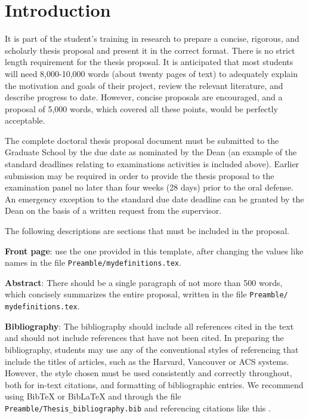 \chapter{Introduction} \label{ch-1}

It is part of the student's training in research to prepare a concise, rigorous, and scholarly thesis proposal and present it in the correct format. There is no strict length requirement for the thesis proposal. It is anticipated that most students will need 8,000-10,000 words (about twenty pages of text) to adequately explain the motivation and goals of their project, review the relevant literature, and describe progress to date. However, concise proposals are encouraged, and a proposal of 5,000 words, which covered all these points, would be perfectly acceptable. 

The complete doctoral thesis proposal document must be submitted to the Graduate School by the due date as nominated by the Dean (an example of the standard deadlines relating to examinations activities is included above). Earlier submission may be required in order to provide the thesis proposal to the examination panel no later than four weeks (28 days) prior to the oral defense. An emergency exception to the standard due date deadline can be granted by the Dean on the basis of a written request from the supervisor.

The following descriptions are sections that must be included in the proposal.

\textbf{Front page}: use the one provided in this template, after changing the values like names in the file \texttt{Preamble/mydefinitions.tex}.

\textbf{Abstract}: There should be a single paragraph of not more than 500 words, which concisely summarizes the entire proposal, written in the file \texttt{Preamble/ mydefinitions.tex}.

\textbf{Bibliography}: The bibliography should include all references cited in the text and should not include references that have not been cited. In preparing the bibliography, students may use any of the conventional styles of referencing that include the titles of articles, such as the Harvard, Vancouver or ACS systems. However, the style chosen must be used consistently and correctly throughout, both for in-text citations, and formatting of bibliographic entries. We recommend using BibTeX or BibLaTeX and through the file \texttt{Preamble/Thesis\_bibliography.bib} and referencing citations like this \cite{Lee98, Muc10, Kra27}. 

